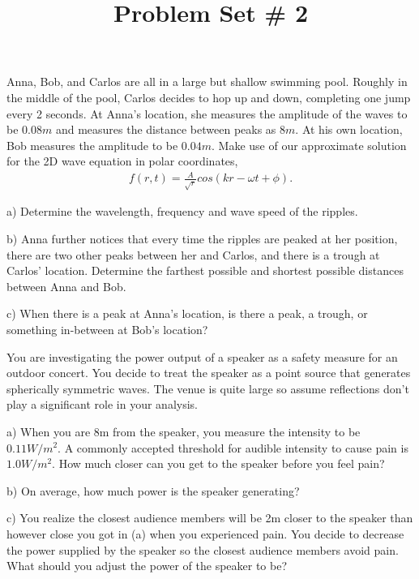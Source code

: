 \documentclass[10pt]{article}
\newenvironment{problem}[2][Problem]{\begin{trivlist}
\item[\hskip \labelsep {\bfseries #1}\hskip \labelsep {\bfseries #2.}]}{\end{trivlist}}
\begin{document}
 \title{Problem Set \# 2}
\date{}
\maketitle

\begin{problem}{1}
Anna, Bob, and Carlos are all in a large but shallow swimming pool. Roughly in the middle of the pool, Carlos decides to hop up and down, completing one jump every 2 seconds. At Anna's location, she measures the amplitude of the waves to be $0.08m$ and measures the distance between peaks as $8m$. At his own location, Bob measures the amplitude to be $0.04m$. Make use of our approximate solution for the 2D wave equation in polar coordinates,
\begin{align}
f(r, t) = \frac{A}{\sqrt{r}} cos (kr - \omega t + \phi). \nonumber
\end{align}

\item a) Determine the wavelength, frequency and wave speed of the ripples.
\item b) Anna further notices that every time the ripples are peaked at her position, there are two other peaks between her and Carlos, and there is a trough at Carlos' location. Determine the farthest possible and shortest possible distances between Anna and Bob.
\item c) When there is a peak at Anna's location, is there a peak, a trough, or something in-between at Bob's location?
\end{problem}
 
\begin{problem}{2}
You are investigating the power output of a speaker as a safety measure for an outdoor concert. You decide to treat the speaker as a point source that generates spherically symmetric waves. The venue is quite large so assume reflections don't play a significant role in your analysis.
\item a) When you are 8m from the speaker, you measure the intensity to be $0.11W/m^2$. A commonly accepted threshold for audible intensity to cause pain is $1.0W/m^2$. How much closer can you get to the speaker before you feel pain?
\item b) On average, how much power is the speaker generating?
\item c) You realize the closest audience members will be 2m closer to the speaker than however close you got in (a) when you experienced pain. You decide to decrease the power supplied by the speaker so the closest audience members avoid pain. What should you adjust the power of the speaker to be?
\end{problem}
\end{document}
